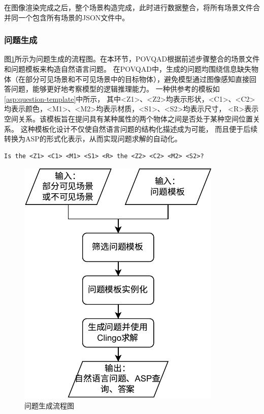 在图像渲染完成之后，整个场景构造完成，此时进行数据整合，将所有场景文件合并同一个包含所有场景的JSON文件中。
\subsubsection{问题生成}
图\ref{fig:question-generation}所示为问题生成的流程图。在本环节，POVQAD根据前述步骤整合的场景文件和问题模板来构造自然语言问题。
在POVQAD中，生成的问题均围绕信息缺失物体（在部分可见场景和不可见场景中的目标物体），避免模型通过图像感知直接回答问题，能够更好地考察模型的逻辑推理能力。
一种供参考的模板如\ref{asp:question-template}中所示，
其中<Z1>、<Z2>均表示形状，<C1>、<C2>均表示颜色，<M1>、<M2>均表示材质，<S1>、<S2>均表示尺寸，
<R>表示空间关系。该模板旨在提问具有某种属性的两个物体之间是否处于某种空间位置关系。
这种模板化设计不仅使自然语言问题的结构化描述成为可能，
而且便于后续转换为ASP的形式化表示，从而实现问题求解的自动化。
\begin{lstlisting}[label=asp:question-template]
Is the <Z1> <C1> <M1> <S1> <R> the <Z2> <C2> <M2> <S2>?  
\end{lstlisting}
\begin{figure}[h]
\centering
\includegraphics{figures/问题生成-crop.pdf}
\caption{问题生成流程图}
\label{fig:question-generation}
\end{figure}

